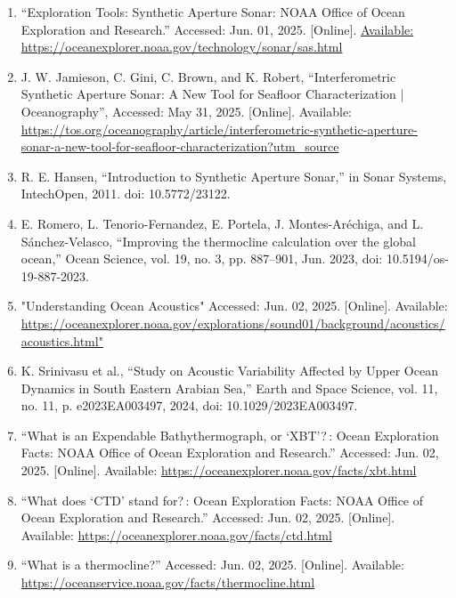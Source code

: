 \documentclass{article}
\begin{document}
\begin{sloppypar}
\begin{enumerate}
    \item{“Exploration Tools: Synthetic Aperture Sonar: NOAA Office of Ocean Exploration and Research.” Accessed: Jun. 01, 2025. [Online]. \url{Available: https://oceanexplorer.noaa.gov/technology/sonar/sas.html}}

    \item{J. W. Jamieson, C. Gini, C. Brown, and K. Robert, “Interferometric Synthetic Aperture Sonar: A New Tool for Seafloor Characterization | Oceanography”, Accessed: May 31, 2025. [Online]. Available: \url{https://tos.org/oceanography/article/interferometric-synthetic-aperture-sonar-a-new-tool-for-seafloor-characterization?utm_source}}

    \item{R. E. Hansen, “Introduction to Synthetic Aperture Sonar,” in Sonar Systems, IntechOpen, 2011. doi: 10.5772/23122.}

    \item{E. Romero, L. Tenorio-Fernandez, E. Portela, J. Montes-Aréchiga, and L. Sánchez-Velasco, “Improving the thermocline calculation over the global ocean,” Ocean Science, vol. 19, no. 3, pp. 887–901, Jun. 2023, doi: 10.5194/os-19-887-2023.}

    \item{"Understanding Ocean Acoustics" Accessed: Jun. 02, 2025. [Online]. Available: \url{https://oceanexplorer.noaa.gov/explorations/sound01/background/acoustics/acoustics.html"}}

    \item{K. Srinivasu et al., “Study on Acoustic Variability Affected by Upper Ocean Dynamics in South Eastern Arabian Sea,” Earth and Space Science, vol. 11, no. 11, p. e2023EA003497, 2024, doi: 10.1029/2023EA003497.}

    \item{“What is an Expendable Bathythermograph, or ‘XBT’? : Ocean Exploration Facts: NOAA Office of Ocean Exploration and Research.” Accessed: Jun. 02, 2025. [Online]. Available: \url{https://oceanexplorer.noaa.gov/facts/xbt.html}}


    \item{“What does ‘CTD’ stand for? : Ocean Exploration Facts: NOAA Office of Ocean Exploration and Research.” Accessed: Jun. 02, 2025. [Online]. Available: \url{https://oceanexplorer.noaa.gov/facts/ctd.html}}


    \item{“What is a thermocline?” Accessed: Jun. 02, 2025. [Online]. Available: \url{https://oceanservice.noaa.gov/facts/thermocline.html}}



\end{enumerate}
\end{sloppypar}
\end{document}
